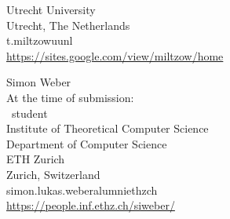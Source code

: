 \documentclass{toc}
\begin{document}
\begin{tocauthors}
\begin{tocinfo}[miltzow]
 Utrecht University\\
 Utrecht, The Netherlands\\
 t.miltzow\tocat{}uu\tocdot{}nl \\   %
 \url{https://sites.google.com/view/miltzow/home}      %
\end{tocinfo}
\begin{tocinfo}[weber]
 Simon Weber\\
 At the time of submission:\\
 \phd\ student\\
 Institute of Theoretical Computer Science\\
 Department of Computer Science\\
 ETH Zurich\\
 Zurich, Switzerland\\
 simon.lukas.weber\tocat{}alumni\tocdot{}ethz\tocdot{}ch \\   %
 \url{https://people.inf.ethz.ch/siweber/}      %
\end{tocinfo}
\end{tocauthors}
%
%
%
%
%
%
%
%
%
%
%
%
%
%
%
%
%
%
%
%
\end{document}
